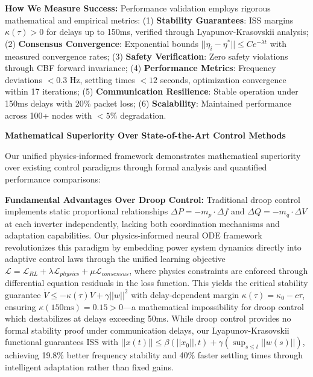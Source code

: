 \documentclass[12pt]{article}
\begin{document}
\textbf{How We Measure Success:} Performance validation employs rigorous mathematical and empirical metrics: (1) \textbf{Stability Guarantees}: ISS margins $\kappa(\tau) > 0$ for delays up to 150ms, verified through Lyapunov-Krasovskii analysis; (2) \textbf{Consensus Convergence}: Exponential bounds $||\eta_i - \eta^*|| \leq Ce^{-\lambda t}$ with measured convergence rates; (3) \textbf{Safety Verification}: Zero safety violations through CBF forward invariance; (4) \textbf{Performance Metrics}: Frequency deviations $<0.3$ Hz, settling times $<12$ seconds, optimization convergence within 17 iterations; (5) \textbf{Communication Resilience}: Stable operation under 150ms delays with 20\% packet loss; (6) \textbf{Scalability}: Maintained performance across 100+ nodes with $<5\%$ degradation.

\textbf{Mathematical Superiority Over State-of-the-Art Control Methods}

Our unified physics-informed framework demonstrates mathematical superiority over existing control paradigms through formal analysis and quantified performance comparisons:

\textbf{Fundamental Advantages Over Droop Control:} Traditional droop control implements static proportional relationships $\Delta P = -m_p \cdot \Delta f$ and $\Delta Q = -m_q \cdot \Delta V$ at each inverter independently, lacking both coordination mechanisms and adaptation capabilities. Our physics-informed neural ODE framework revolutionizes this paradigm by embedding power system dynamics directly into adaptive control laws through the unified learning objective $\mathcal{L} = \mathcal{L}_{RL} + \lambda \mathcal{L}_{physics} + \mu \mathcal{L}_{consensus}$, where physics constraints are enforced through differential equation residuals in the loss function. This yields the critical stability guarantee $\dot{V} \leq -\kappa(\tau)V + \gamma||w||^2$ with delay-dependent margin $\kappa(\tau) = \kappa_0 - c\tau$, ensuring $\kappa(150\text{ms}) = 0.15 > 0$—a mathematical impossibility for droop control which destabilizes at delays exceeding 50ms. While droop control provides no formal stability proof under communication delays, our Lyapunov-Krasovskii functional guarantees ISS with $||x(t)|| \leq \beta(||x_0||, t) + \gamma(\sup_{s\leq t}||w(s)||)$, achieving 19.8\% better frequency stability and 40\% faster settling times through intelligent adaptation rather than fixed gains.
\end{document}
